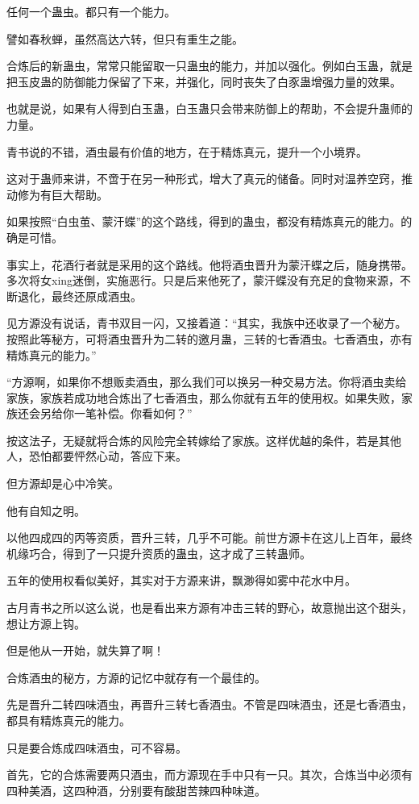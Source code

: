 \begin{this_body}
任何一个蛊虫。都只有一个能力。

譬如春秋蝉，虽然高达六转，但只有重生之能。

合炼后的新蛊虫，常常只能留取一只蛊虫的能力，并加以强化。例如白玉蛊，就是把玉皮蛊的防御能力保留了下来，并强化，同时丧失了白豕蛊增强力量的效果。

也就是说，如果有人得到白玉蛊，白玉蛊只会带来防御上的帮助，不会提升蛊师的力量。

青书说的不错，酒虫最有价值的地方，在于精炼真元，提升一个小境界。

这对于蛊师来讲，不啻于在另一种形式，增大了真元的储备。同时对温养空窍，推动修为有巨大帮助。

如果按照“白虫茧、蒙汗蝶”的这个路线，得到的蛊虫，都没有精炼真元的能力。的确是可惜。

事实上，花酒行者就是采用的这个路线。他将酒虫晋升为蒙汗蝶之后，随身携带。多次将女xing迷倒，实施恶行。只是后来他死了，蒙汗蝶没有充足的食物来源，不断退化，最终还原成酒虫。

见方源没有说话，青书双目一闪，又接着道：“其实，我族中还收录了一个秘方。按照此等秘方，可将酒虫晋升为二转的邀月蛊，三转的七香酒虫。七香酒虫，亦有精炼真元的能力。”

“方源啊，如果你不想贩卖酒虫，那么我们可以换另一种交易方法。你将酒虫卖给家族，家族若成功地合炼出了七香酒虫，那么你就有五年的使用权。如果失败，家族还会另给你一笔补偿。你看如何？”

按这法子，无疑就将合炼的风险完全转嫁给了家族。这样优越的条件，若是其他人，恐怕都要怦然心动，答应下来。

但方源却是心中冷笑。

他有自知之明。

以他四成四的丙等资质，晋升三转，几乎不可能。前世方源卡在这儿上百年，最终机缘巧合，得到了一只提升资质的蛊虫，这才成了三转蛊师。

五年的使用权看似美好，其实对于方源来讲，飘渺得如雾中花水中月。

古月青书之所以这么说，也是看出来方源有冲击三转的野心，故意抛出这个甜头，想让方源上钩。

但是他从一开始，就失算了啊！

合炼酒虫的秘方，方源的记忆中就存有一个最佳的。

先是晋升二转四味酒虫，再晋升三转七香酒虫。不管是四味酒虫，还是七香酒虫，都具有精炼真元的能力。

只是要合炼成四味酒虫，可不容易。

首先，它的合炼需要两只酒虫，而方源现在手中只有一只。其次，合炼当中必须有四种美酒，这四种酒，分别要有酸甜苦辣四种味道。


\end{this_body}
